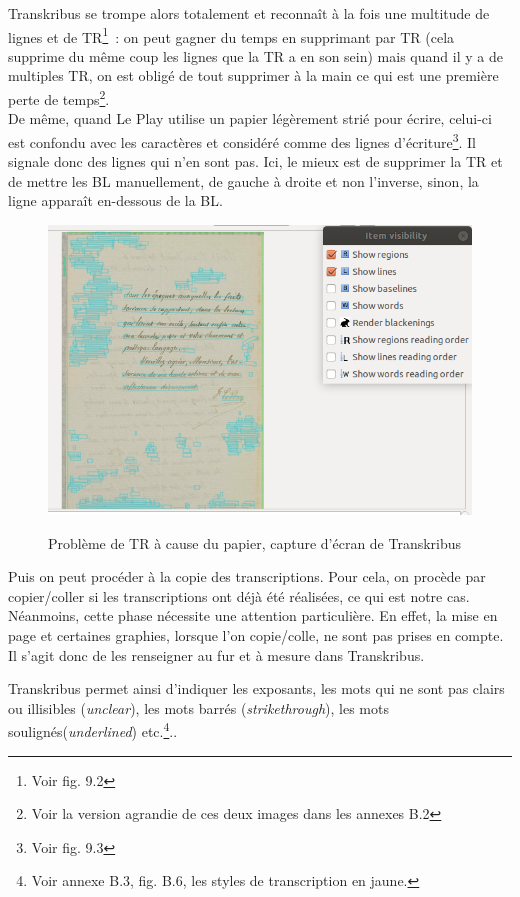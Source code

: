Transkribus se trompe alors totalement et reconnaît à la fois une multitude de lignes et de TR\footnote{Voir fig. 9.2}~: on peut gagner du temps en supprimant par TR (cela supprime du même coup les lignes que la TR a en son sein) mais quand il y a de multiples TR, on est obligé de tout supprimer à la main ce qui est une première perte de temps\footnote{Voir la version agrandie de ces deux images dans les annexes B.2}.\\

De même, quand Le Play utilise un papier légèrement strié pour écrire, celui-ci est confondu avec les caractères et considéré comme des lignes d'écriture\footnote{Voir fig. 9.3}. Il signale donc des lignes qui n'en sont pas. Ici, le mieux est de supprimer la TR et de mettre les BL manuellement, de gauche à droite et non l'inverse, sinon, la ligne apparaît en-dessous de la BL.\\

\begin{figure}[ht]
    \centering
    \caption{Problème de TR à cause du papier, capture d'écran de Transkribus}
    \includegraphics[width=13cm]{images/strieTranskribus.png}
    \label{strieTranskribus}
\end{figure}


Puis on peut procéder à la copie des transcriptions. Pour cela, on procède par copier/coller si les transcriptions ont déjà été réalisées, ce qui est notre cas. 
Néanmoins, cette phase nécessite une attention particulière. En effet, la mise en page et certaines graphies, lorsque l'on copie/colle, ne sont pas prises en compte. Il s'agit donc de les renseigner au fur et à mesure dans Transkribus. 

Transkribus permet ainsi d'indiquer les exposants, les mots qui ne sont pas clairs ou illisibles (\emph{unclear}), les mots barrés (\emph{strikethrough}), les mots soulignés(\emph{underlined}) etc.\footnote{Voir annexe B.3, fig. B.6, les styles de transcription en jaune.}..

